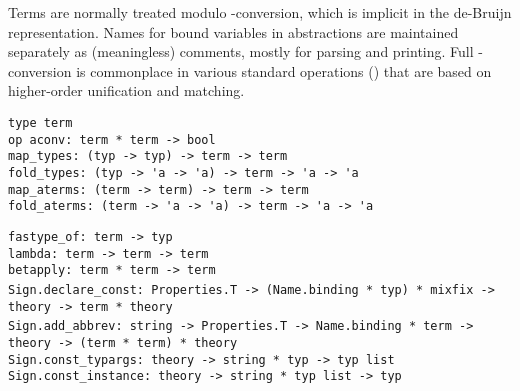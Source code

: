 \begin{isabellebody}
\begin{isamarkuptext}
  Terms are normally treated modulo \isa{{\isasymalpha}}-conversion, which is
  implicit in the de-Bruijn representation.  Names for bound variables
  in abstractions are maintained separately as (meaningless) comments,
  mostly for parsing and printing.  Full \isa{{\isasymalpha}{\isasymbeta}{\isasymeta}}-conversion is
  commonplace in various standard operations ()
  that are based on higher-order unification and matching.%
\end{isamarkuptext}%
\isamarkuptrue%
%
\isadelimmlref
%
\endisadelimmlref
%
\isatagmlref
%
\begin{isamarkuptext}%
\begin{mldecls}
  \verb|type term| \\
  \verb|op aconv: term * term -> bool| \\
  \verb|map_types: (typ -> typ) -> term -> term| \\
  \verb|fold_types: (typ -> 'a -> 'a) -> term -> 'a -> 'a| \\
  \verb|map_aterms: (term -> term) -> term -> term| \\
  \verb|fold_aterms: (term -> 'a -> 'a) -> term -> 'a -> 'a| \\
  \end{mldecls}
  \begin{mldecls}
  \verb|fastype_of: term -> typ| \\
  \verb|lambda: term -> term -> term| \\
  \verb|betapply: term * term -> term| \\
  \verb|Sign.declare_const: Properties.T -> (Name.binding * typ) * mixfix ->|\isasep\isanewline%
\verb|  theory -> term * theory| \\
  \verb|Sign.add_abbrev: string -> Properties.T -> Name.binding * term ->|\isasep\isanewline%
\verb|  theory -> (term * term) * theory| \\
  \verb|Sign.const_typargs: theory -> string * typ -> typ list| \\
  \verb|Sign.const_instance: theory -> string * typ list -> typ| \\
  \end{mldecls}

  \begin{description}


\end{description}
\end{isamarkuptext}
\end{isabellebody}
